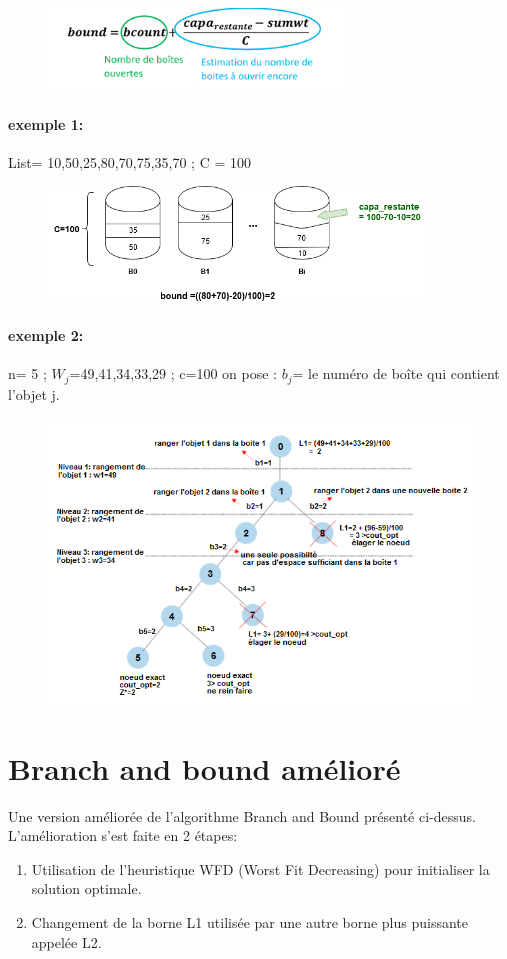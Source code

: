 \documentclass[12pt]{article}
\begin{document}
\begin{figure}[h!]
    \includegraphics[width=8cm]{../figures/formule1.png}
\end{figure}
\paragraph{exemple 1: }
List= {10,50,25,80,70,75,35,70} ;   C = 100 
\begin{figure}[h!]
    \includegraphics[width=10cm]{../figures/example1.png}
\end{figure}
\paragraph{exemple 2: }
n= 5 ; $W_{j}$={49,41,34,33,29} ; c=100 
on pose : $b_j$= le numéro de boîte qui contient l’objet j.

\begin{figure}[h!]
    \includegraphics[width=\linewidth]{../figures/diag2.png}
\end{figure}
\section{Branch and bound amélioré}
Une version améliorée de l’algorithme Branch and Bound présenté ci-dessus. L’amélioration s’est faite en 2 étapes: 
\begin{enumerate}
    \item Utilisation de l’heuristique WFD (Worst Fit Decreasing) pour initialiser la solution optimale.
    \item Changement de la borne L1 utilisée par une autre borne plus puissante appelée L2. 
\end{enumerate}
\end{document}
